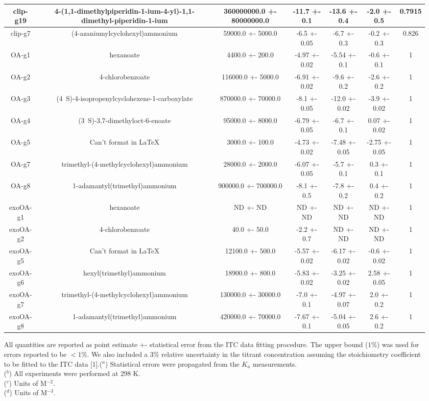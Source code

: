 \documentclass{article}
\begin{document}
\begin{center}
\begin{tabu}{| c | c | c | c | c | c | c |}
\hline
clip-g19 & 4-(1,1-dimethylpiperidin-1-ium-4-yl)-1,1-dimethyl-piperidin-1-ium & 360000000.0 +- 80000000.0 & -11.7 +- 0.1 & -13.6 +- 0.4 & -2.0 +- 0.5 & 0.7915 \\
\hline
clip-g7 & (4-azaniumylcyclohexyl)ammonium & 59000.0 +- 5000.0 & -6.5 +- 0.05 & -6.7 +- 0.3 & -0.2 +- 0.3 & 0.826 \\
\hline
\hline
OA-g1 & hexanoate & 4400.0 +- 200.0 & -4.97 +- 0.02 & -5.54 +- 0.1 & -0.6 +- 0.1 & 1 \\
\hline
OA-g2 & 4-chlorobenzoate & 116000.0 +- 5000.0 & -6.91 +- 0.02 & -9.6 +- 0.2 & -2.6 +- 0.2 & 1 \\
\hline
OA-g3 & (4~{S})-4-isopropenylcyclohexene-1-carboxylate & 870000.0 +- 70000.0 & -8.1 +- 0.05 & -12.0 +- 0.02 & -3.9 +- 0.02 & 1 \\
\hline
OA-g4 & (3~{S})-3,7-dimethyloct-6-enoate & 95000.0 +- 8000.0 & -6.79 +- 0.05 & -6.7 +- 0.1 & 0.07 +- 0.02 & 1 \\
\hline
OA-g5 & Can't format in LaTeX & 3000.0 +- 100.0 & -4.73 +- 0.02 & -7.48 +- 0.05 & -2.75 +- 0.05 & 1 \\
\hline
OA-g7 & trimethyl-(4-methylcyclohexyl)ammonium & 28000.0 +- 2000.0 & -6.07 +- 0.05 & -5.7 +- 0.1 & 0.3 +- 0.1 & 1 \\
\hline
OA-g8 & 1-adamantyl(trimethyl)ammonium & 900000.0 +- 700000.0 & -8.1 +- 0.5 & -7.8 +- 0.2 & 0.4 +- 0.2 & 1 \\
\hline
\hline
exoOA-g1 & hexanoate & ND +- ND & ND +- ND & ND +- ND & ND +- ND & 1 \\
\hline
exoOA-g2 & 4-chlorobenzoate & 40.0 +- 50.0 & -2.2 +- 0.7 & ND +- ND & ND +- ND & 1 \\
\hline
exoOA-g5 & Can't format in LaTeX & 12100.0 +- 500.0 & -5.57 +- 0.02 & -6.17 +- 0.02 & -0.6 +- 0.02 & 1 \\
\hline
exoOA-g6 & hexyl(trimethyl)ammonium & 18900.0 +- 800.0 & -5.83 +- 0.02 & -3.25 +- 0.02 & 2.58 +- 0.05 & 1 \\
\hline
exoOA-g7 & trimethyl-(4-methylcyclohexyl)ammonium & 130000.0 +- 30000.0 & -7.0 +- 0.1 & -4.97 +- 0.07 & 2.0 +- 0.2 & 1 \\
\hline
exoOA-g8 & 1-adamantyl(trimethyl)ammonium & 420000.0 +- 70000.0 & -7.67 +- 0.1 & -5.04 +- 0.05 & 2.6 +- 0.2 & 1 \\
\hline
\end{tabu}\end{center}\vspace{5mm}
All quantities are reported as point estimate +- statistical error from the ITC data fitting procedure. The upper bound ($1\%$) was used for errors reported to be $<1\%$. We also included a 3\% relative uncertainty in the titrant concentration assuming the stoichiometry coefficient to be fitted to the ITC data [1].($^a$) Statistical errors were propagated from the $K_a$ measurements. \\
($^b$) All experiments were performed at 298 K. \\
($^c$) Units of M$^{-2}$. \\
($^d$) Units of M$^{-3}$.
\end{document}

